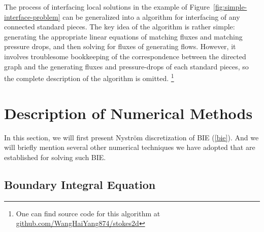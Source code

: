 \documentclass[10pt,twocolumn,letterpaper]{article}
\begin{document}
The process of interfacing local solutions in the example of Figure~\ref{fig:simple-interface-problem} 
can be generalized into a algorithm for interfacing of any connected standard pieces. 
The key idea of the algorithm is rather simple: 
generating the appropriate linear equations of matching fluxes and matching pressure drops,  
and then solving for fluxes of generating flows.
However, it involves troublesome bookkeeping of the correspondence between the directed graph 
and the generating fluxes and pressure-drops of each standard pieces, 
so the complete description of the algorithm is omitted. 
\footnote{One can find source code for this algorithm at  \href{https://github.com/WangHaiYang874/stokes2d/blob/main/src/pipe_system/pipe_system.py}{github.com/WangHaiYang874/stokes2d}}


\section{Description of Numerical Methods\label{sec:numericalmethod}}

In this section,
we will first present Nystr\"om discretization of BIE (\ref{bie}).
And we will briefly mention several other numerical techniques we have adopted that
are established for solving such BIE. 

\subsection{Boundary Integral Equation}
\end{document}
